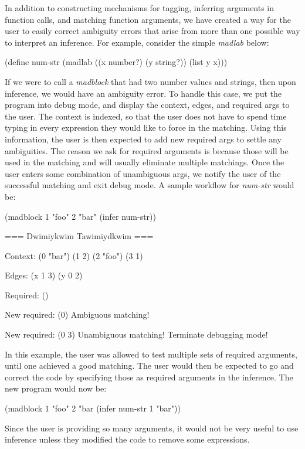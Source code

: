 \documentclass[11pt]{article}
\begin{document}
In addition to constructing mechanisms for tagging,
inferring arguments in function calls, and matching function arguments,
we have created a way for the user to easily correct ambiguity errors
that arise from more than one possible way to interpret an inference.
For example, consider the simple \textit{madlab} below:
\begin{verbbox}
(define num-str
 (madlab ((x number?) (y string?))
         (list y x)))
\end{verbbox}
\begin{center}\theverbbox\end{center}
If we were to call a \textit{madblock} that had two number values and strings,
then upon inference, we would have an ambiguity error.
To handle this case, we put the program into debug mode,
and display the context, edges, and required args to the user.
The context is indexed, so that the user does not have to spend time
typing in every expression they would like to force in the matching.
Using this information, the user is then expected to add new required args
to settle any ambiguities.
The reason we ask for required arguments is because those will be used
in the matching and will usually eliminate multiple matchings.
Once the user enters some combination of unambiguous args,
we notify the user of the successful matching and exit debug mode.
A sample workflow for \textit{num-str} would be:
\begin{verbbox}
(madblock
 1
 "foo"
 2
 "bar"
 (infer num-str))

=== Dwimiykwim Tawimiydkwim ===

Context:
(0 "bar")
(1 2)
(2 "foo")
(3 1)

Edges:
(x 1 3)
(y 0 2)

Required:
()

New required:
(0)
Ambiguous matching!

New required:
(0 3)
Unambiguous matching! Terminate debugging mode!
\end{verbbox}
\begin{center}\theverbbox\end{center}
In this example, the user was allowed to test multiple sets of required
arguments, until one achieved a good matching.
The user would then be expected to go and correct the code
by specifying those as required arguments in the inference.
The new program would now be:
\begin{verbbox}
(madblock
 1
 "foo"
 2
 "bar
 (infer num-str 1 "bar"))
\end{verbbox}
\begin{center}\theverbbox\end{center}
Since the user is providing so many arguments, it would not be very useful
to use inference unless they modified the code to remove some expressions.
\end{document}
